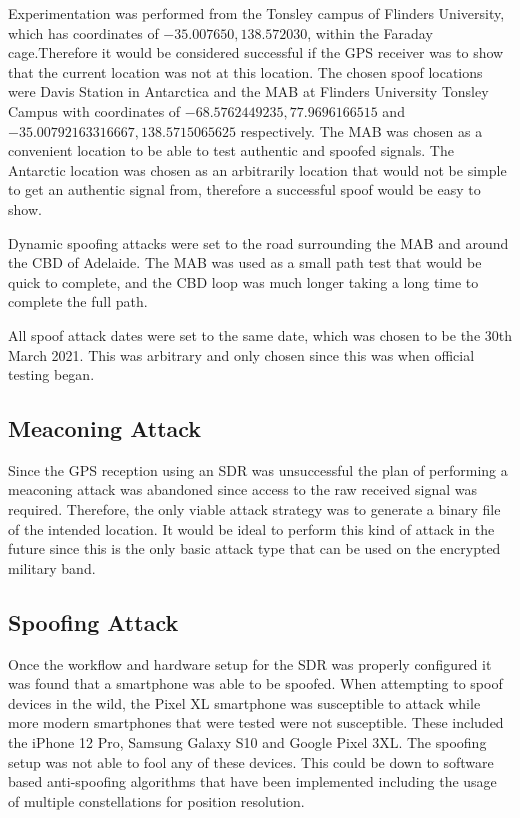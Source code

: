 Experimentation was performed from the Tonsley campus of Flinders University, which has coordinates of $-35.007650, 138.572030$, within the Faraday cage.Therefore it would
be considered successful if the GPS receiver was to show that the current location was not at this location. The chosen spoof locations were Davis Station in
Antarctica and the MAB at Flinders University Tonsley Campus with coordinates of $-68.5762449235, 77.9696166515$ and $-35.00792163316667, 138.5715065625$ respectively.
The MAB was chosen as a convenient location to be able to test authentic and spoofed signals. The Antarctic location was chosen as an arbitrarily location that would
not be simple to get an authentic signal from, therefore a successful spoof would be easy to show.

Dynamic spoofing attacks were set to the road surrounding the MAB and around the CBD of Adelaide. The MAB was used as a small path test that would be quick to complete,
and the CBD loop was much longer taking a long time to complete the full path.


All spoof attack dates were set to the same date, which was chosen to be
the 30th March 2021. This was arbitrary and only chosen since this was when official testing began.

\subsection{Meaconing Attack}
Since the GPS reception using an SDR was unsuccessful the plan of performing a meaconing attack was abandoned since access to the raw received signal was required.
Therefore, the only viable attack strategy was to generate a binary file of the intended location. It would be ideal to perform this kind of attack in the future since
this is the only basic attack type that can be used on the encrypted military band.

\subsection{Spoofing Attack}
Once the workflow and hardware setup for the SDR was properly configured it was found that a smartphone was able to be spoofed.
When attempting to spoof devices in the wild, the Pixel XL smartphone was susceptible to attack while more modern smartphones that were tested were not susceptible. These
included the iPhone 12 Pro, Samsung Galaxy S10 and Google Pixel 3XL. The spoofing setup was not able to fool any of these devices. This could be down to software based
anti-spoofing algorithms that have been implemented including the usage of multiple constellations for position resolution.

